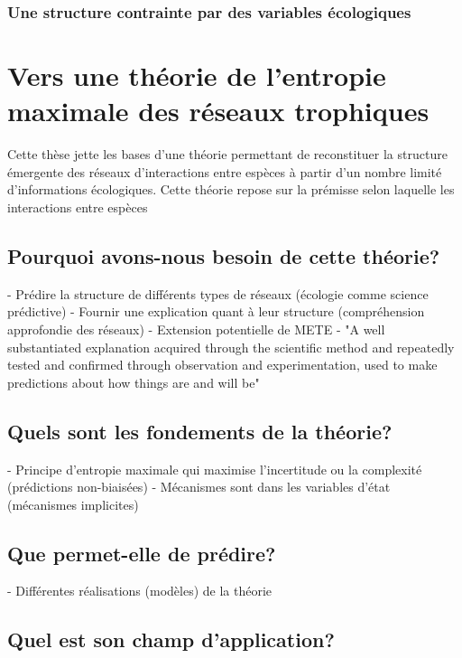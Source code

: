 \subsubsection{Une structure contrainte par des variables écologiques} 



\section{Vers une théorie de l'entropie maximale des réseaux trophiques}

Cette thèse jette les bases d'une théorie permettant de reconstituer la
structure émergente des réseaux d'interactions entre espèces à partir d'un
nombre limité d'informations écologiques. Cette théorie repose sur la prémisse
selon laquelle les interactions entre espèces 

\subsection{Pourquoi avons-nous besoin de cette théorie?} 

- Prédire la structure de différents types de réseaux (écologie comme science prédictive)
- Fournir une explication quant à leur structure (compréhension approfondie des réseaux)
- Extension potentielle de METE
- "A well substantiated explanation acquired through the scientific method 
and repeatedly tested and confirmed through observation and experimentation, 
used to make predictions about how things are and will be"

\subsection{Quels sont les fondements de la théorie?} 

- Principe d'entropie maximale qui maximise l'incertitude ou la complexité (prédictions non-biaisées) 
- Mécanismes sont dans les variables d'état (mécanismes implicites)

\subsection{Que permet-elle de prédire?} 

- Différentes réalisations (modèles) de la théorie 

\subsection{Quel est son champ d'application?} 

